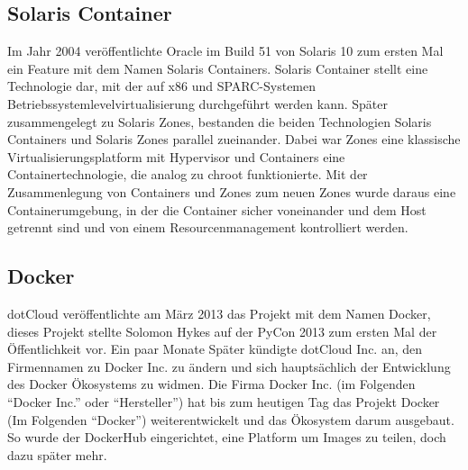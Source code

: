 \subsection*{Solaris Container}
\label{sec:solariscontainer}

Im Jahr 2004 veröffentlichte Oracle im Build 51 von Solaris 10 zum ersten Mal ein Feature mit dem Namen Solaris Containers. Solaris Container stellt eine Technologie dar, mit der auf x86 und SPARC-Systemen Betriebssystemlevelvirtualisierung durchgeführt werden kann. Später zusammengelegt zu Solaris Zones, bestanden die beiden Technologien Solaris Containers und Solaris Zones parallel zueinander. Dabei war Zones eine klassische Virtualisierungsplatform mit Hypervisor und Containers eine Containertechnologie, die analog zu chroot funktionierte. Mit der Zusammenlegung von Containers und Zones zum neuen Zones wurde daraus eine Containerumgebung, in der die Container sicher voneinander und dem Host getrennt sind und von einem Resourcenmanagement kontrolliert werden.\cite{OracleZonesIntro,OracleZonesOver}
	




\subsection*{Docker}
\label{sec:Docker}


dotCloud veröffentlichte am März 2013 das Projekt mit dem Namen Docker, dieses Projekt stellte Solomon Hykes auf der PyCon 2013 zum ersten Mal der Öffentlichkeit vor. \cite{dockeryout1} Ein paar Monate Später kündigte dotCloud Inc. an, den Firmennamen zu Docker Inc. zu ändern und sich hauptsächlich der Entwicklung des Docker Ökosystems zu widmen.\cite{dockerblog} Die Firma Docker Inc. (im Folgenden "`Docker Inc."' oder "`Hersteller"') hat bis zum heutigen Tag das Projekt Docker (Im Folgenden "`Docker"') weiterentwickelt und das Ökosystem darum ausgebaut. So wurde der DockerHub eingerichtet, eine Platform um Images zu teilen, doch dazu später mehr.

